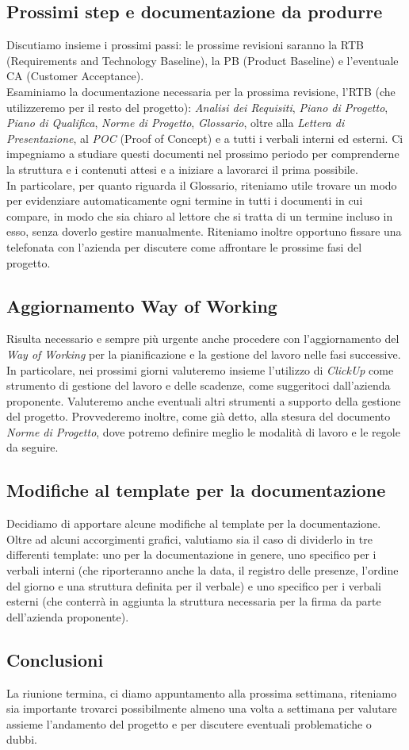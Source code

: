 \documentclass[italian,12pt]{article} %
\begin{document}
\subsection{Prossimi step e documentazione da produrre}
Discutiamo insieme i prossimi passi: le prossime revisioni saranno la RTB (Requirements and Technology Baseline), la PB (Product Baseline) e l'eventuale CA (Customer Acceptance).\\
Esaminiamo la documentazione necessaria per la prossima revisione, l'RTB (che utilizzeremo per il resto del progetto): \textit{Analisi dei Requisiti}, \textit{Piano di Progetto}, 
\textit{Piano di Qualifica}, \textit{Norme di Progetto}, \textit{Glossario},  oltre alla \textit{Lettera di Presentazione}, al \textit{POC} (Proof of Concept) e a tutti i verbali interni ed esterni. Ci impegniamo a studiare questi documenti nel prossimo periodo per comprenderne la struttura e i contenuti attesi e a iniziare a lavorarci il prima possibile.\\ In particolare, per quanto riguarda il Glossario, riteniamo utile trovare un modo per evidenziare automaticamente ogni termine in tutti i documenti in cui compare, in modo che sia chiaro al lettore che si tratta di un termine incluso in esso, senza doverlo gestire manualmente. Riteniamo inoltre opportuno fissare una telefonata con l'azienda per discutere come affrontare le prossime fasi del progetto.

\subsection{Aggiornamento Way of Working}
Risulta necessario e sempre più urgente anche procedere con l'aggiornamento del 
\textit{Way of Working} per la pianificazione e la gestione del lavoro nelle fasi 
successive. \\
In particolare, nei prossimi giorni valuteremo insieme l'utilizzo di \textit{ClickUp} 
come strumento di gestione del lavoro e delle scadenze, come suggeritoci 
dall'azienda proponente. Valuteremo anche eventuali altri strumenti a supporto della 
gestione del progetto. Provvederemo inoltre, come già detto, alla stesura del 
documento \textit{Norme di Progetto}, dove potremo definire meglio le modalità di 
lavoro e le regole da seguire.

\subsection{Modifiche al template per la documentazione}
Decidiamo di apportare alcune modifiche al template per la documentazione. \\
Oltre ad alcuni accorgimenti grafici, valutiamo sia il caso di dividerlo 
in tre differenti template: uno per la documentazione in genere, uno specifico per i verbali interni (che riporteranno anche la data, il registro delle presenze, l'ordine del giorno e una struttura definita per il verbale) e uno specifico per i verbali esterni (che conterrà in aggiunta la struttura necessaria per la firma da parte dell'azienda proponente).

\subsection{Conclusioni}
La riunione termina, ci diamo appuntamento alla prossima settimana, riteniamo sia 
importante trovarci possibilmente almeno una volta a settimana per valutare assieme 
l'andamento del progetto e per discutere eventuali problematiche o dubbi.
\end{document}
